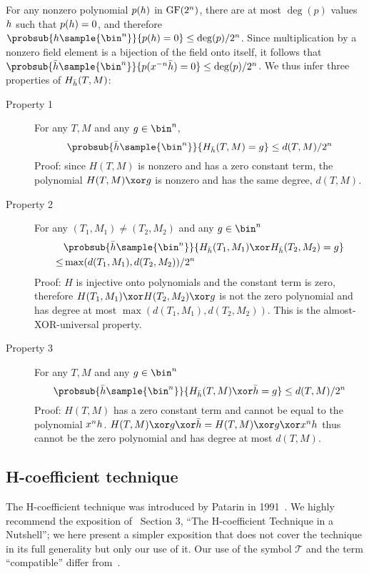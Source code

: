 \documentclass[hctr2.tex]{subfiles}
\begin{document}
For any nonzero polynomial \(p(h)\)
in \(\operatorname{GF}(2^n)\), there are at most \(\deg(p)\) values \(h\)
such that \(p(h) = 0\), and therefore
\(\probsub{\hpoly\sample{\bin^n}}{p(\hpoly) = 0} \leq \deg(p)/2^n\).
Since multiplication by a nonzero field element
is a bijection of the field onto itself, it follows that
\(\probsub{\hgen\sample{\bin^n}}{p(x^{-n}\hgen) = 0} \leq \deg(p)/2^n\).
We thus infer three properties of \(H_{\bar{h}}(T, M)\):
\begin{description}
    \item[Property 1]
    For any \(T, M\) and any \(g \in \bin^n\),
    \begin{displaymath}
        \probsub{\hgen\sample{\bin^n}}{H_{\hgen}(T, M) = g} \leq d(T, M)/2^n
    \end{displaymath}
    Proof: since \(H(T, M)\) is nonzero and has
    a zero constant term,
    the polynomial \(H(T, M) \xor g\) 
    is nonzero and has the same degree, \(d(T, M)\).
    \item[Property 2] 
    For any \((T_1, M_1) \neq (T_2, M_2)\) and any \(g \in \bin^n\)
    \begin{align*}
        & \probsub{\hgen\sample{\bin^n}}{H_{\hgen}(T_1, M_1) \xor H_{\hgen}(T_2, M_2) = g} \\
        \leq  & \max(d(T_1, M_1), d(T_2, M_2))/2^n
    \end{align*}
    Proof: \(H\) is injective onto polynomials
    and the constant term is zero, therefore
    \(H(T_1, M_1) \xor H(T_2, M_2) \xor g\)
    is not the zero polynomial and
    has degree at most \(\max(d(T_1, M_1), d(T_2, M_2))\).
    This is the almost-XOR-universal property.
    \item[Property 3]
    For any \(T, M\) and any \(g \in \bin^n\)
    \begin{displaymath}
        \probsub{\hgen\sample{\bin^n}}{H_{\hgen}(T, M) \xor \hgen = g} \leq d(T, M)/2^n
    \end{displaymath}
    Proof: \(H(T, M)\) has a zero constant term and
    cannot be equal to the polynomial \(x^nh\).
    \(H(T, M) \xor g \xor \hgen = H(T, M) \xor g \xor x^n\hpoly\)
    thus cannot be the zero polynomial and has
    degree at most \(d(T, M)\).
\end{description}

\subsection{H-coefficient technique}\label{hco}
The H-coefficient technique was introduced by Patarin in 1991~\cite{ppdes,hco}.
We highly recommend the exposition
of~\cite{hco2} Section 3,
``The H-coefficient Technique in a Nutshell'';
we here present a simpler exposition that
does not cover the technique in its full
generality but only our use of it.
Our use of the symbol \(\mathcal{T}\) and the term
``compatible'' differ from~\cite{hco2}.
\end{document}
